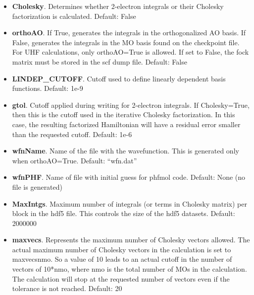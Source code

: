 \begin{itemize}
\item \textbf{Cholesky}. Determines whether 2-electron integrals or their Cholesky factorization is calculated.
  Default: False
\item \textbf{orthoAO}. If True, generates the integrals in the orthogonalized AO basis. If False, generates the integrals in the MO basis found on the checkpoint file. For UHF calculations, only orthoAO=True is allowed. If set to False, the fock matrix must be stored in the scf dump file.
  Default: False
\item \textbf{LINDEP\_CUTOFF}.  Cutoff used to define linearly dependent basis functions.
  Default: 1e-9
\item \textbf{gtol}. Cutoff applied during writing for 2-electron integrals. If Cholesky=True, then this is the cutoff used in the iterative Cholesky factorization. In this case, the resulting factorized Hamiltonian will have a residual error smaller than the requested cutoff.
  Default: 1e-6
\item \textbf{wfnName}. Name of the file with the wavefunction. This is generated only  when orthoAO=True.
  Default: ``wfn.dat''
\item \textbf{wfnPHF}. Name of file with initial guess for phfmol code.
  Default: None (no file is generated)
\item \textbf{MaxIntgs}. Maximum number of integrals  (or terms in Cholesky matrix) per block in the hdf5 file. This controls the size of the hdf5 datasets.
  Default: 2000000
\item \textbf{maxvecs}. Represents the maximum number of Cholesky vectors allowed. The actual maximum number of Cholesky vectors in the calculation is set to maxvecsnmo. So a value of 10 leads to an actual cutoff in the number of vectors of 10*nmo, where nmo is the total number of MOs in the calculation. The calculation will stop at the requested number of vectors even if the tolerance is not reached.
  Default: 20
\end{itemize}
